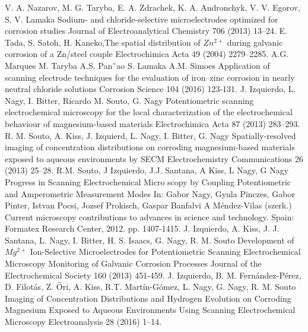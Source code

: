 \documentclass[3p]{elsarticle}
\begin{document}
\begin{thebibliography}{5}
V. A. Nazarov, M. G. Taryba, E. A. Zdrachek, K. A. Andronchyk, V. V. Egorov, S. V. Lamaka Sodium- and chloride-selective microelectrodes optimized for corrosion studies Journal of Electroanalytical Chemistry 706 (2013) 13–24.
E. Tada, S. Satoh, H. Kaneko,The spatial distribution of $Zn^{2+}$ during galvanic corrosion of a Zn/steel couple Electrochimica Acta 49 (2004) 2279–2285.
A.G. Marques M. Taryba A.S. Pan˜ao S. Lamaka A.M. Simoes Application of scanning electrode techniques for the evaluation of iron–zinc corrosion in nearly neutral chloride solutions Corrosion Science 104 (2016) 123-131.
J. Izquierdo, L. Nagy, I. Bitter, Ricardo M. Souto, G. Nagy 
Potentiometric scanning electrochemical microscopy for the local characterization of the electrochemical behaviour of magnesium-based materials Electrochimica Acta 87 (2013) 283–293.
R. M. Souto, A. Kiss, J. Izquierd, L. Nagy, I. Bitter, G. Nagy Spatially-resolved imaging of concentration distributions on corroding magnesium-based materials exposed to aqueous environments by SECM Electrochemistry Communications 26 (2013) 25–28.
R.M. Souto, J Izquierdo, J.J. Santana, A Kiss, L Nagy, G Nagy 
Progress in Scanning Electrochemical Micro scopy by Coupling Potentiometric and Amperometric Measurement Modes
In: Gabor Nagy, Gyula Pinczes, Gabor Pinter, Istvan Pocsi, Jozsef Prokisch, Gaspar Banfalvi
A Méndez-Vilas (szerk.)
Current microscopy contributions to advances in science and technology. Spain: Formatex Research Center, 2012. pp. 1407-1415.
J. Izquierdo, A. Kiss, J. J. Santana, L. Nagy, I. Bitter, H. S. Isaacs, G. Nagy, R. M. Souto
Development of $Mg^{2+}$ Ion-Selective Microelectrodes for Potentiometric Scanning Electrochemical Microscopy Monitoring of Galvanic Corrosion Processes
Journal of the Electrochemical Society  160 (2013) 451-459. 
J. Izquierdo, B. M. Fernández-Pérez, D. Filotás, Z. Őri, A. Kiss, R.T. Martín-Gómez, L. Nagy, G. Nagy, R. M. Souto Imaging of Concentration Distributions and Hydrogen Evolution on Corroding Magnesium Exposed to Aqueous Environments Using Scanning Electrochemical Microscopy Electroanalysis 28 (2016) 1–14.

\end{thebibliography}
\end{document}
